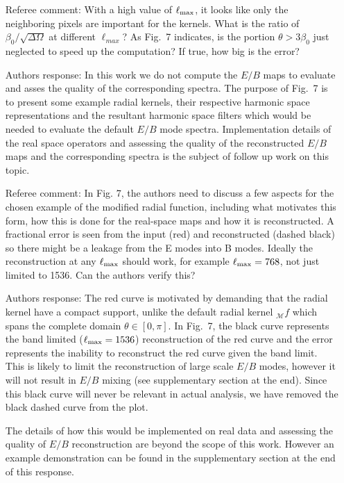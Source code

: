 \documentclass[12pt]{article}
\newcommand{\revisit}{\textcolor{magenta}}
\begin{document}
\begin{itemize}
\item[{Referee comment: }] With a high value of $\ell_{\rm max}$, it looks like only the neighboring pixels are important for the kernels. What is the ratio of $\beta_0/\sqrt{\Delta \Omega}$ at different $\ell_{max}$? As Fig.~7 indicates, is the portion $\theta > 3\beta_0$ just neglected to speed up the computation? If true, how big is the error?
\item[{Authors response: }] In this work we do not compute the $E/B$ maps to evaluate and asses the quality of the corresponding spectra. The purpose of Fig.~7 is to present some example radial kernels, their respective harmonic space representations and the resultant harmonic space filters which would be needed to evaluate the default $E/B$ mode spectra. Implementation details of the real space operators and assessing the quality of the reconstructed $E/B$ maps and the corresponding spectra is the subject of follow up work on this topic. 

\item[{Referee comment: }] In Fig. 7, the authors need to discuss a few aspects for the chosen example of the modified radial function, including what motivates this form, how this is done for the real-space maps and how it is reconstructed. A fractional error is seen from the input (red) and reconstructed (dashed black) so there might be a leakage from the E modes into B modes. Ideally the reconstruction at any $\ell_{\rm max}$ should work, for example $\ell_{\rm max} = 768$, not just limited to 1536. Can the authors verify this?
\item[{Authors response: }] The red curve is motivated by demanding that the radial kernel have a compact support, unlike the default radial kernel ${}_\mathcal{M} f$ which spans the complete domain $\theta \in [0,\pi]$. In Fig.~7, the black curve represents the band limited ($\ell_{\rm max}=1536$) reconstruction of the red curve and the error represents the inability to reconstruct the red curve given the band limit. This is likely to limit the reconstruction of large scale $E/B$ modes, however it will not result in $E/B$ mixing (see supplementary section at the end). Since this black curve will never be relevant in actual analysis, we have removed the black dashed curve from the plot. 

The details of how this would be implemented on real data and assessing the quality of $E/B$ reconstruction are beyond the scope of this work. However an example demonstration can be found in the supplementary section at the end of this response.


\end{itemize}
\end{document}
